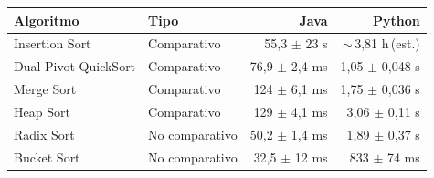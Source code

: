 {\small
\begin{tabular}{llrr}
\toprule
Algoritmo & Tipo & Java & Python \\
\midrule
Insertion Sort & Comparativo & 55,3 $\pm$ 23 s & $\sim$\,3,81 h\,(est.) \\
Dual-Pivot QuickSort & Comparativo & 76,9 $\pm$ 2,4 ms & 1,05 $\pm$ 0,048 s \\
Merge Sort & Comparativo & 124 $\pm$ 6,1 ms & 1,75 $\pm$ 0,036 s \\
Heap Sort & Comparativo & 129 $\pm$ 4,1 ms & 3,06 $\pm$ 0,11 s \\
Radix Sort & No comparativo & 50,2 $\pm$ 1,4 ms & 1,89 $\pm$ 0,37 s \\
Bucket Sort & No comparativo & 32,5 $\pm$ 12 ms & 833 $\pm$ 74 ms \\
\bottomrule
\end{tabular}}\par
